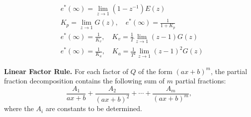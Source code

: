 \newpage
\begin{multicols}{3}
\begin{align*}
& e^\ast(\infty)=\lim_{z \rightarrow 1} (1-z^{-1})E(z) \\
& K_p=\lim_{z \rightarrow 1} G(z), \quad e^\ast (\infty) = \frac{1}{1+K_p} \\
& e^\ast(\infty) = \frac{1}{K_v}, \quad K_v = \frac{1}{T} \lim_{z \rightarrow 1}(z-1) G(z)  \\
& e^\ast(\infty) = \frac{1}{K_a}, \quad K_a = \frac{1}{T^2} \lim_{z \rightarrow 1}(z-1)^2 G(z)
\end{align*}

{\bf Linear Factor Rule.}  
For each factor of $Q$ of the form $(ax+b)^m$, 
the partial fraction decomposition contains 
the following sum of $m$ partial fractions:  
\[
\frac{A_1}{ax+b} + \frac{A_2}{(ax+b)^2} + \cdots + \frac{A_m}{(ax+b)^m},
\]
where the $A_i$ are constants to be determined.  


\end{multicols}
